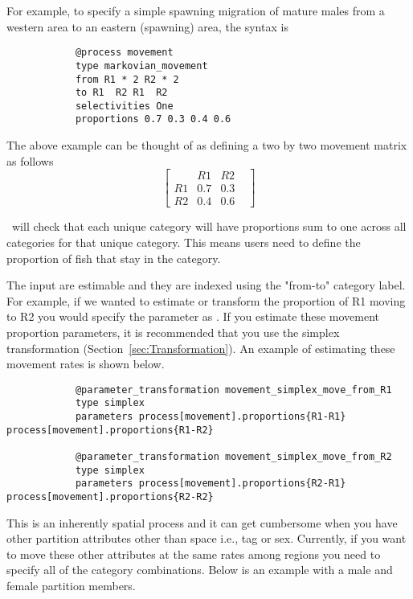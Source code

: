 For example, to specify a simple spawning migration of mature males from a western area to an eastern (spawning) area, the syntax is

{\small{\begin{verbatim}
			@process movement
			type markovian_movement
			from R1 * 2 R2 * 2
			to R1  R2 R1  R2
			selectivities One
			proportions 0.7 0.3 0.4 0.6
\end{verbatim}}}

The above example can be thought of as defining a two by two movement matrix as follows
\[
\begin{bmatrix}
	& R1 & R2 & \\
	R1 & 0.7 & 0.3  \\
	R2 & 0.4  & 0.6 
\end{bmatrix}
\]

\CNAME\ will check that each unique  category will have proportions sum to one across all  categories for that unique  category. This means users need to define the proportion of fish that stay in the  category.

The input  are estimable and they are indexed using the "from-to" category label. For example, if we wanted to estimate or transform the proportion of R1 moving to R2 you would specify the parameter as . If you estimate these movement proportion parameters, it is recommended that you use the simplex transformation (Section~\ref{sec:Transformation}). An example of estimating these movement rates is shown below.

{\small{\begin{verbatim}
			@parameter_transformation movement_simplex_move_from_R1
			type simplex
			parameters process[movement].proportions{R1-R1} process[movement].proportions{R1-R2}
			
			@parameter_transformation movement_simplex_move_from_R2
			type simplex
			parameters process[movement].proportions{R2-R1} 		process[movement].proportions{R2-R2}			
\end{verbatim}}}

This is an inherently spatial process and it can get cumbersome when you have other partition attributes other than space i.e., tag or sex. Currently, if you want to move these other attributes at the same rates among regions you need to specify all of the category combinations. Below is an example with a male and female partition members.


